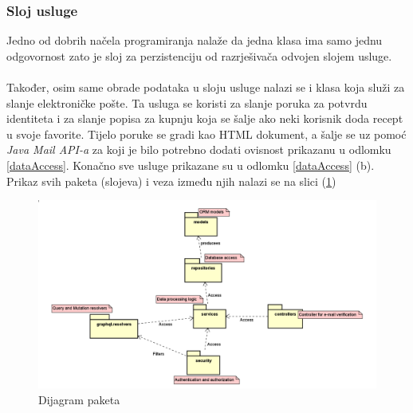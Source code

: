 \documentclass[times, utf8, zavrsni]{fer}
\begin{document}
\subsubsection{Sloj usluge}
\label{serviceLayer}
Jedno od dobrih načela programiranja nalaže da jedna klasa ima samo jednu odgovornost
zato je sloj za perzistenciju od razrješivača odvojen slojem usluge.
\\\\
Također, osim same obrade podataka u sloju usluge nalazi se i klasa koja služi za slanje elektroničke pošte.
Ta usluga se koristi za slanje poruka za potvrdu identiteta i za slanje popisa za kupnju
koja se šalje ako neki korisnik doda recept u svoje favorite. Tijelo poruke se gradi
kao HTML dokument, a šalje se uz pomoć \textit{Java Mail API-a} za koji je bilo potrebno dodati ovisnost
prikazanu u odlomku \ref{dataAccess}. Konačno sve usluge prikazane su u odlomku \ref{dataAccess} (b).
Prikaz svih paketa (slojeva) i veza između njih nalazi se na slici (\ref{fig:packageDijagram})
\begin{figure}[h]
      \centering
      \includegraphics[width=\textwidth]{packageDiagram.png}
      \caption{Dijagram paketa}
      \label{fig:packageDijagram}
\end{figure}
\end{document}
